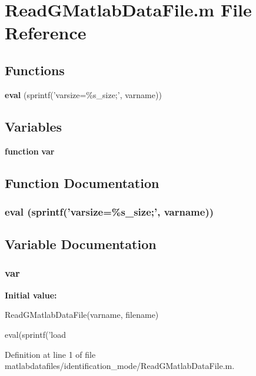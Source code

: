 \section{ReadGMatlabDataFile.m File Reference}
\label{matlabdatafiles_2identification__mode_2ReadGMatlabDataFile_8m}
\subsection*{Functions}
\begin{DoxyCompactItemize}
\item 
{\bf eval} (sprintf('varsize=\%s\_\-size;', varname))
\end{DoxyCompactItemize}
\subsection*{Variables}
\begin{DoxyCompactItemize}
\item 
{\bf function} {\bf var}
\end{DoxyCompactItemize}


\subsection{Function Documentation}
\subsubsection[{eval}]{\setlength{\rightskip}{0pt plus 5cm}eval (sprintf('varsize=\%s\_\-size;', varname))}\label{matlabdatafiles_2identification__mode_2ReadGMatlabDataFile_8m_a6f217d64e43fd40c2eb04a81e57d7a1f}


\subsection{Variable Documentation}
\subsubsection[{var}]{ {\bf var}}\label{matlabdatafiles_2identification__mode_2ReadGMatlabDataFile_8m_a4fdd13e26a831c0dff92f623df42f347}
{\bfseries Initial value:}
\begin{DoxyCode}
 ReadGMatlabDataFile(varname, filename)

eval(sprintf('load %
\end{DoxyCode}


Definition at line 1 of file matlabdatafiles/identification\_\-mode/ReadGMatlabDataFile.m.